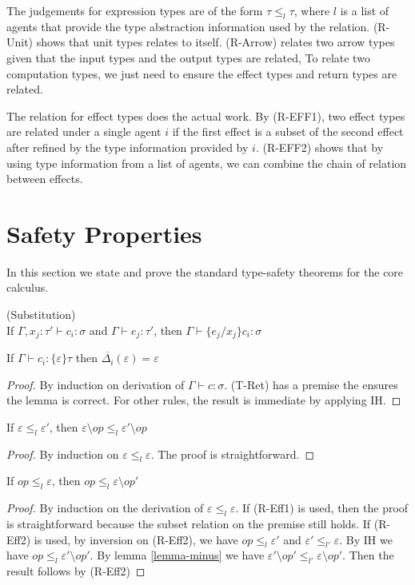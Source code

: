The judgements for expression types are of the form $\tau \leq_l \tau$, where $l$ is a list of agents that provide the type abstraction information used by the relation. (R-Unit) shows that unit types relates to itself. (R-Arrow) relates two arrow types given that the input types and the output types are related,  To relate two computation types, we just need to ensure the effect types and return types are related. 

The relation for effect types does the actual work. By (R-EFF1), two effect types are related under a single agent $i$ if the first effect is a subset of the second effect after refined by the type information provided by $i$. (R-EFF2) shows that by using type information from a list of agents, we can combine the chain of relation between effects.

\section{Safety Properties}
In this section we state and prove the standard type-safety theorems for the core calculus.
\begin{lemma} (Substitution) \\
If $\Gamma, x_j : \tau' \vdash c_i : \sigma$ and $\Gamma \vdash e_j : \tau'$, then $\Gamma \vdash \{e_j/x_j\}c_i : \sigma$
\end{lemma}

\begin{lemma} 
\label{lemma-exact}
If $\Gamma \vdash c_i : \{\varepsilon\}\tau$ then $\overline{\Delta_i}(\varepsilon) = \varepsilon$
\begin{proof}
By induction on derivation of $\Gamma \vdash c : \sigma$. (T-Ret) has a premise the ensures the lemma is correct. For other rules, the result is immediate by applying IH.

\end{proof}
\end{lemma}

\begin{lemma}
\label{lemma-minus}
If $\varepsilon \leq_l \varepsilon'$, then $\varepsilon \setminus op \leq_l \varepsilon' \setminus op$
\begin{proof}
By induction on $\varepsilon \leq_l \varepsilon$. The proof is straightforward.
\end{proof}

\end{lemma}

\begin{lemma}
\label{lemma-relation}
If $op \leq_{l} \varepsilon$, then $op \leq_{l} \varepsilon \setminus op'$
\begin{proof}
By induction on the derivation of $\varepsilon \leq_l \varepsilon$. If (R-Eff1) is used, then the proof is straightforward because the subset relation on the premise still holds. If (R-Eff2) is used, by inversion on (R-Eff2), we have $op \leq_l \varepsilon'$ and $\varepsilon' \leq_{l'} \varepsilon$. By IH we have $op \leq_l \varepsilon' \setminus op'$. By lemma \ref{lemma-minus} we have $\varepsilon'  \setminus op' \leq_{l'} \varepsilon \setminus op'$. Then the result follows by (R-Eff2)
\end{proof}
\end{lemma}

